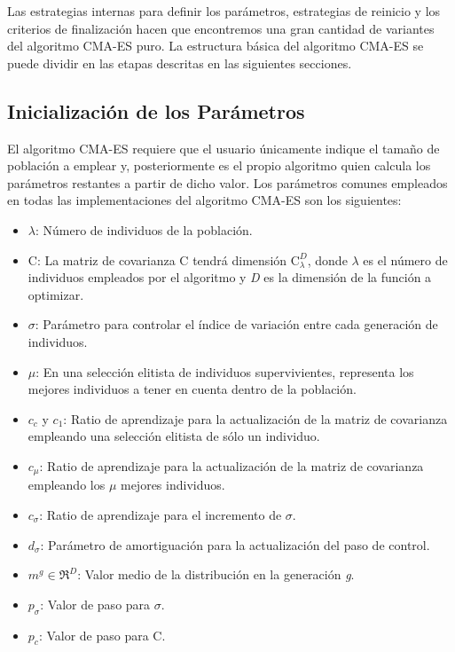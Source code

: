 Las estrategias internas para definir los parámetros, estrategias de reinicio y los criterios de finalización hacen que encontremos una gran cantidad de variantes del algoritmo CMA-ES puro. La estructura básica del algoritmo CMA-ES se puede dividir en las etapas descritas en las siguientes secciones. \\ 

\bigskip

\subsection{Inicialización de los Parámetros}

El algoritmo CMA-ES requiere que el usuario únicamente indique el tamaño de población a emplear y, posteriormente es el propio algoritmo quien calcula los parámetros restantes a partir de dicho valor. Los parámetros comunes empleados en todas las implementaciones del algoritmo CMA-ES son los siguientes: 

\begin{itemize}
\item $\lambda$: Número de individuos de la población.
\item C: La matriz de covarianza C tendrá dimensión $\textrm{C}_{\lambda}^{D}$, donde $\lambda$ es el número de individuos empleados por el algoritmo y \textit{D} es la dimensión de la función a optimizar.
\item $\sigma$: Parámetro para controlar el índice de variación entre cada generación de individuos.
\item $\mu$: En una selección elitista de individuos supervivientes, representa los mejores individuos a tener en cuenta dentro de la población.
\item $c_{c}$ y $c_{1}$: Ratio de aprendizaje para la actualización de la matriz de covarianza empleando una selección elitista de sólo un individuo.
\item $c_{\mu}$: Ratio de aprendizaje para la actualización de la matriz de covarianza empleando los $\mu$ mejores individuos.
\item $c_{\sigma}$: Ratio de aprendizaje para el incremento de $\sigma$.
\item $d_{\sigma}$: Parámetro de amortiguación para la actualización del paso de control.
\item $m^{g} \in \Re^{D}$: Valor medio de la distribución en la generación \textit{g}.
\item $p_{\sigma}$: Valor de paso para $\sigma$.
\item $p_{c}$: Valor de paso para C.
\end{itemize}

